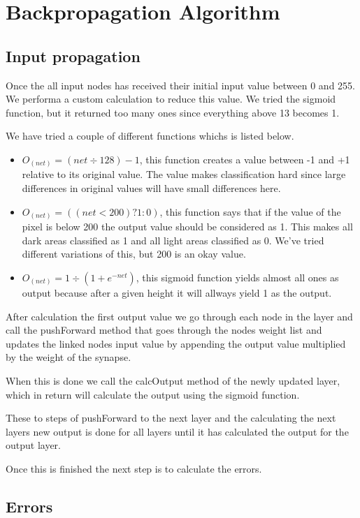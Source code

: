 \chapter{Backpropagation Algorithm} \label{chp:backprop}

\section{Input propagation}
Once the all input nodes has received their initial input value between 0 and
255. We performa a custom calculation to reduce this value. We tried the sigmoid
function, but it returned too many ones since everything above 13 becomes 1.

We have tried a couple of different functions whichs is listed below.
\begin{itemize}
	\item $O_{(net)} = (net \div 128) - 1$, this function creates a value between -1 and +1
		relative to its original value.  The value makes classification hard since
		large differences in original values will have small differences here.
	\item $O_{(net)} = ( (net<200)  ?  1 : 0 )$, this function says that if the
		value of the pixel is below 200 the output value should be considered as 1.
		This makes all dark areas classified as 1 and all light areas classified as
		0. We've tried different variations of this, but 200 is an okay value.
	\item $O_{(net)} = 1 \div ( 1 + e^{-net} )$, this sigmoid function yields
		almost all ones as output because after a given height it will allways yield
		1 as the output.
\end{itemize}

After calculation the first output value we go through each node in the layer
and call the pushForward method that goes through the nodes weight list and
updates the linked nodes input value by appending the output value multiplied by
the weight of the synapse.

When this is done we call the calcOutput method of the newly updated layer,
which in return will calculate the output using the sigmoid function.

These to steps of pushForward to the next layer and the calculating the next
layers new output is done for all layers until it has calculated the output for
the output layer.

Once this is finished the next step is to calculate the errors.

\section{Errors}
